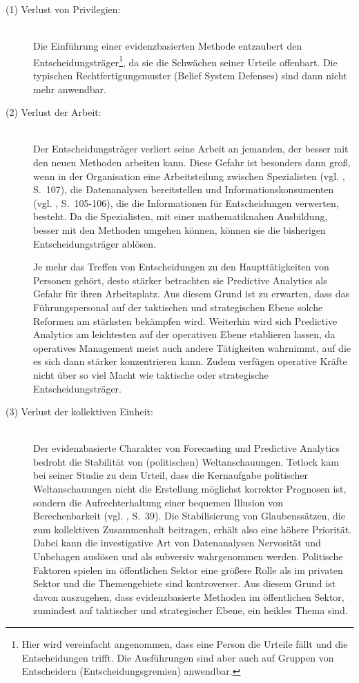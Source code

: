 \begin{description}
\item[(1) Verlust von Privilegien:] \hfill \\
Die Einführung einer evidenzbasierten Methode entzaubert den Entscheidungsträger\footnote{
Hier wird vereinfacht angenommen, dass eine Person die Urteile fällt und die Entscheidungen
trifft. Die Ausführungen sind aber auch auf Gruppen von Entscheidern (Entscheidungsgremien)
anwendbar.
}, da sie die Schwächen seiner Urteile offenbart. Die typischen Rechtfertigungsmuster
(Belief System Defenses)
sind dann nicht mehr anwendbar.

\item[(2) Verlust der Arbeit:] \hfill \\
Der Entscheidungsträger verliert seine Arbeit an jemanden, der besser mit den neuen Methoden
arbeiten kann. Diese Gefahr ist besonders dann groß, wenn in der Organisation eine Arbeitsteilung
zwischen Spezialisten (vgl. \cite{Gluchowski}, S.~107), die Datenanalysen bereitstellen und Informationskonsumenten
(vgl. \cite{Gluchowski}, S.~105-106), die die Informationen für Entscheidungen verwerten, besteht. 
Da die Spezialisten, mit einer mathematiknahen Ausbildung, besser mit den Methoden umgehen können, 
können sie die bisherigen Entscheidungsträger ablösen.

Je mehr das Treffen von Entscheidungen zu den Haupttätigkeiten von Personen
gehört, desto stärker betrachten sie Predictive Analytics als Gefahr für ihren
Arbeitsplatz. Aus diesem Grund ist zu erwarten, dass das Führungspersonal auf der taktischen
und strategischen Ebene solche Reformen am stärksten bekämpfen wird. Weiterhin wird sich Predictive
Analytics am leichtesten auf der operativen Ebene etablieren lassen, da operatives Management meist
auch andere Tätigkeiten wahrnimmt, auf die es sich dann stärker konzentrieren kann. Zudem verfügen
operative Kräfte nicht über so viel Macht wie taktische oder strategische Entscheidungsträger.

\item[(3) Verlust der kollektiven Einheit:] \hfill \\
Der evidenzbasierte Charakter von Forecasting und Predictive Analytics bedroht die Stabilität
von (politischen) Weltanschauungen.
Tetlock kam bei seiner Studie zu dem Urteil, dass die Kernaufgabe politischer Weltanschauungen
nicht die Erstellung möglichst korrekter Prognosen ist, sondern die
Aufrechterhaltung einer bequemen Illusion von Berechenbarkeit
(vgl. \cite{Tetlock}, S.~39). Die Stabilisierung von Glaubenssätzen, die zum
kollektiven Zusammenhalt beitragen, erhält also eine höhere Priorität.
Dabei kann die investigative Art von Datenanalysen Nervosität und Unbehagen auslösen und als
subversiv wahrgenommen werden. Politische Faktoren spielen im öffentlichen Sektor eine größere Rolle als
im privaten Sektor und die Themengebiete sind kontroverser. Aus diesem Grund ist davon auszugehen, dass
evidenzbasierte Methoden im öffentlichen Sektor, zumindest auf taktischer und strategischer Ebene,
ein heikles Thema sind. 

\end{description}


